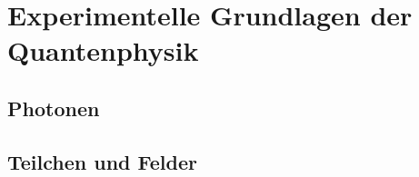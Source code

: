 \section{Experimentelle Grundlagen der Quantenphysik}%
\label{quant:sec:experimentelle_grundlagen_der_quantenphysik}

\subsection{Photonen}%
\label{quant:sub:photonen}

\subsection{Teilchen und Felder}%
\label{quant:sub:teilchen_und_felder}
